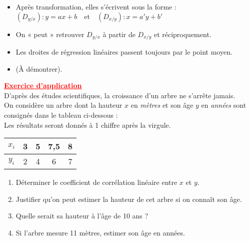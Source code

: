 \documentclass[12pt,a4paper]{article}
\begin{document}
\begin{itemize}
    \item Après transformation, elles s’écrivent sous la forme : \\
    \( (D_{y/x}) : y = ax + b \quad \text{et} \quad (D_{x/y}) : x = a'y + b' \)
    
    \item On « peut » retrouver \( D_{y/x} \) à partir de \( D_{x/y} \) et réciproquement.

    \item Les droites de régression linéaires passent toujours par le point moyen.

    \item 
     \quad (À démontrer).
\end{itemize}
\noindent
\textbf{\textcolor{red}{\underline{Exercice d’application}}} \\

D’après des études scientifiques, la croissance d’un arbre ne s’arrête jamais.\\
On considère un arbre dont la hauteur \( x \) en \textit{mètres} et son âge \( y \) en \textit{années} sont consignés dans le tableau ci-dessous :\\
Les résultats seront donnés à 1 chiffre après la virgule.

\vspace{0.5cm}

\begin{center}
\begin{tabular}{|c|c|c|c|c|}
\hline
\( x_i \) & 3 & 5 & 7{,}5 & 8 \\
\hline
\( y_i \) & 2 & 4 & 6 & 7 \\
\hline
\end{tabular}
\end{center}

\vspace{0.5cm}

\begin{enumerate}
    \item Déterminer le coefficient de corrélation linéaire entre \( x \) et \( y \).
    \item Justifier qu’on peut estimer la hauteur de cet arbre si on connaît son âge.
    \item Quelle serait sa hauteur à l’âge de 10 ans ?
    \item Si l’arbre mesure 11 mètres, estimer son âge en années.
\end{enumerate}
\end{document}
